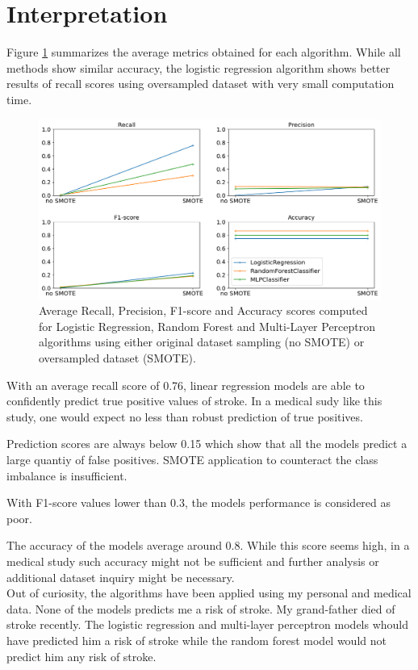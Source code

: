 \section{Interpretation}
Figure \ref{metrics_all} summarizes the average metrics obtained for each algorithm. While all 
methods show similar accuracy, the logistic regression algorithm shows better results of recall scores 
using oversampled dataset with very small computation time.

\begin{figure}[H]
\centering
\includegraphics[scale=0.5]{../figures/plot_metrics_all.png}
\caption{Average Recall, Precision, F1-score and Accuracy scores computed for Logistic Regression, 
Random Forest and Multi-Layer Perceptron algorithms using either original dataset sampling (no SMOTE) 
or oversampled dataset (SMOTE).}
\label{metrics_all}
\end{figure}

With an average recall score of 0.76, linear regression models are able to confidently predict true
positive values of stroke. In a medical sudy like this study, one would expect no less than robust 
prediction of true positives.

Prediction scores are always below 0.15 which show that all the models predict a large quantiy of 
false positives. SMOTE application to counteract the class imbalance is insufficient.

With F1-score values lower than 0.3, the models performance is considered as poor.

The accuracy of the models average around 0.8. While this score seems high, in a medical study such 
accuracy might not be sufficient and further analysis or additional dataset inquiry might be 
necessary.\\ 


Out of curiosity, the algorithms have been applied using my personal and medical data. None of the 
models predicts me a risk of stroke. My grand-father died of stroke recently. The logistic regression and 
multi-layer perceptron models whould have predicted him a risk of stroke while the random forest model 
would not predict him any risk of stroke. 

